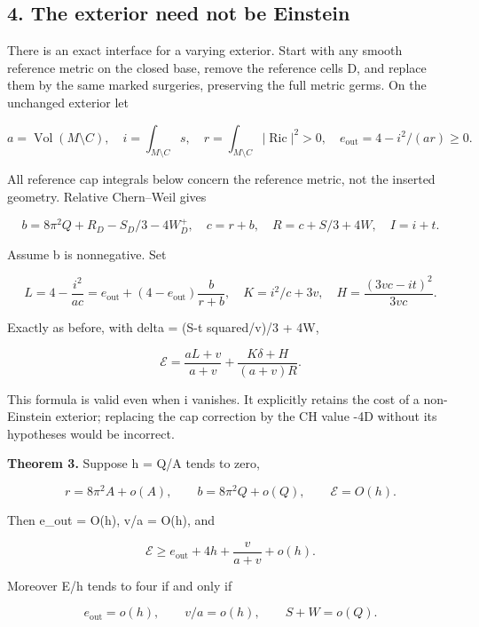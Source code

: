 \documentclass[
  10pt,
]{article}
\begin{document}
\hypertarget{the-exterior-need-not-be-einstein}{%
\subsection{4. The exterior need not be
Einstein}\label{the-exterior-need-not-be-einstein}}

There is an exact interface for a varying exterior. Start with any
smooth reference metric on the closed base, remove the reference cells
D, and replace them by the same marked surgeries, preserving the full
metric germs. On the unchanged exterior let

\[
 a=\operatorname{Vol}(M\setminus C),\quad
 i=\int_{M\setminus C}s,\quad
 r=\int_{M\setminus C}|\operatorname{Ric}|^2>0,
 \quad e_{\mathrm{out}}=4-i^2/(ar)\ge0.
\]

All reference cap integrals below concern the reference metric, not the
inserted geometry. Relative Chern--Weil gives

\[
 b=8\pi^2Q+R_D-S_D/3-4W_D^+,\quad c=r+b,\quad
 R=c+S/3+4W,\quad I=i+t.                                 \tag{4.1}
\]

Assume b is nonnegative. Set

\[
 L=4-\frac{i^2}{ac}
  =e_{\mathrm{out}}+(4-e_{\mathrm{out}})\frac b{r+b},
 \quad K=i^2/c+3v,\quad H=\frac{(3vc-it)^2}{3vc}.
\]

Exactly as before, with delta = (S-t squared/v)/3 + 4W,

\[
 \boxed{\mathcal E=\frac{aL+v}{a+v}
                 +\frac{K\delta+H}{(a+v)R}.}             \tag{4.2}
\]

This formula is valid even when i vanishes. It explicitly retains the
cost of a non-Einstein exterior; replacing the cap correction by the CH
value -4D without its hypotheses would be incorrect.

\textbf{Theorem 3.} Suppose h = Q/A tends to zero,

\[
 r=8\pi^2A+o(A),\qquad b=8\pi^2Q+o(Q),
                    \qquad\mathcal E=O(h).              \tag{4.3}
\]

Then e\_out = O(h), v/a = O(h), and

\[
 \boxed{\mathcal E\ge e_{\mathrm{out}}+4h+\frac{v}{a+v}+o(h).}
                                                               \tag{4.4}
\]

Moreover E/h tends to four if and only if

\[
 e_{\mathrm{out}}=o(h),\qquad v/a=o(h),\qquad S+W=o(Q).
                                                               \tag{4.5}
\]
\end{document}
